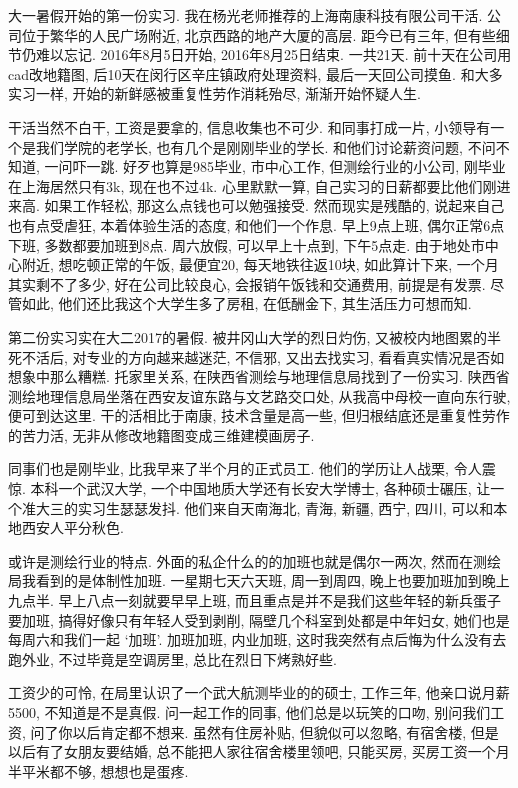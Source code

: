 \documentclass[a4paper, UTF8,  12pt]{article}
\begin{document}
大一暑假开始的第一份实习. 我在杨光老师推荐的上海南康科技有限公司干活. 公司位于繁华的人民广场附近, 北京西路的地产大厦的高层. 距今已有三年, 但有些细节仍难以忘记. 2016年8月5日开始, 2016年8月25日结束. 一共21天. 前十天在公司用cad改地籍图, 后10天在闵行区辛庄镇政府处理资料, 最后一天回公司摸鱼. 和大多实习一样, 开始的新鲜感被重复性劳作消耗殆尽, 渐渐开始怀疑人生. 

干活当然不白干, 工资是要拿的, 信息收集也不可少. 和同事打成一片, 小领导有一个是我们学院的老学长, 也有几个是刚刚毕业的学长. 和他们讨论薪资问题, 不问不知道, 一问吓一跳. 好歹也算是985毕业, 市中心工作, 但测绘行业的小公司, 刚毕业在上海居然只有3k, 现在也不过4k. 心里默默一算, 自己实习的日薪都要比他们刚进来高. 如果工作轻松, 那这么点钱也可以勉强接受. 然而现实是残酷的, 说起来自己也有点受虐狂, 本着体验生活的态度, 和他们一个作息. 早上9点上班, 偶尔正常6点下班, 多数都要加班到8点. 周六放假, 可以早上十点到, 下午5点走. 由于地处市中心附近, 想吃顿正常的午饭, 最便宜20, 每天地铁往返10块, 如此算计下来, 一个月其实剩不了多少, 好在公司比较良心, 会报销午饭钱和交通费用, 前提是有发票. 尽管如此, 他们还比我这个大学生多了房租, 在低酬金下, 其生活压力可想而知.

第二份实习实在大二2017的暑假. 被井冈山大学的烈日灼伤, 又被校内地图累的半死不活后, 对专业的方向越来越迷茫, 不信邪, 又出去找实习, 看看真实情况是否如想象中那么糟糕. 托家里关系, 在陕西省测绘与地理信息局找到了一份实习. 陕西省测绘地理信息局坐落在西安友谊东路与文艺路交口处, 从我高中母校一直向东行驶, 便可到达这里. 干的活相比于南康, 技术含量是高一些, 但归根结底还是重复性劳作的苦力活, 无非从修改地籍图变成三维建模画房子. 

同事们也是刚毕业, 比我早来了半个月的正式员工. 他们的学历让人战栗, 令人震惊. 本科一个武汉大学, 一个中国地质大学还有长安大学博士, 各种硕士碾压, 让一个准大三的实习生瑟瑟发抖. 他们来自天南海北, 青海, 新疆, 西宁, 四川, 可以和本地西安人平分秋色. 

或许是测绘行业的特点. 外面的私企什么的的加班也就是偶尔一两次, 然而在测绘局我看到的是体制性加班. 一星期七天六天班, 周一到周四, 晚上也要加班加到晚上九点半. 早上八点一刻就要早早上班, 而且重点是并不是我们这些年轻的新兵蛋子要加班, 搞得好像只有年轻人受到剥削, 隔壁几个科室到处都是中年妇女, 她们也是每周六和我们一起 \lq 加班\rq . 加班加班, 内业加班, 这时我突然有点后悔为什么没有去跑外业, 不过毕竟是空调房里, 总比在烈日下烤熟好些. 

工资少的可怜, 在局里认识了一个武大航测毕业的的硕士, 工作三年, 他亲口说月薪5500, 不知道是不是真假. 问一起工作的同事, 他们总是以玩笑的口吻, 别问我们工资, 问了你以后肯定都不想来. 虽然有住房补贴, 但貌似可以忽略, 有宿舍楼, 但是以后有了女朋友要结婚, 总不能把人家往宿舍楼里领吧, 只能买房, 买房工资一个月半平米都不够, 想想也是蛋疼. 
\end{document}
